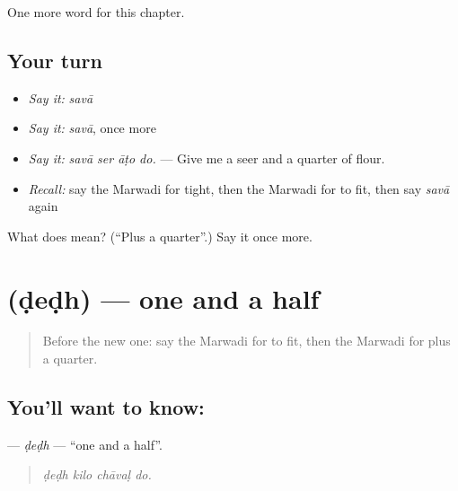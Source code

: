\begin{grammarlens}[title={What you've built}]
One more word for this chapter.
\end{grammarlens}

\subsection*{Your turn}
\begin{itemize}
\raggedright
  \item \emph{Say it:} \emph{savā}
  \item \emph{Say it:} \emph{savā}, once more
  \item \emph{Say it:} \emph{savā ser āṭo do.} — Give me a seer and a quarter of flour.
  \item \emph{Recall:} say the Marwadi for tight, then the Marwadi for to fit, then say \emph{savā} again
\end{itemize}

\begin{tcolorbox}[breakable,colback=teal!4,colframe=teal!35!black,title={Before you move on}]
What does  mean? (\textquotedblleft{}Plus a quarter\textquotedblright{}.) Say it once more.
\end{tcolorbox}
\section[\texorpdfstring{\mw{डेढ} (ḍeḍh)}{डेढ (ḍeḍh)}]{ (ḍeḍh) — one and a half}

\label{lesson:MW-C212-dedh}



\begin{quote}
Before the new one: say the Marwadi for to fit, then the Marwadi for plus a quarter.
\end{quote}

\subsection*{You'll want to know: }
\textbf{} — \emph{ḍeḍh} — \textquotedblleft{}one and a half\textquotedblright{}.

\begin{quote}
   
\end{quote}

\begin{quote}
\emph{ḍeḍh kilo chāvaḷ do.}
\end{quote}

